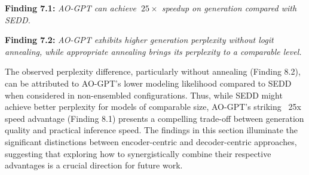 \begin{tcolorbox}[
    enhanced,
    colback=LightGoldenrodYellow!40,
    colframe=black!20,
    arc=2mm, 
    boxrule=0.5pt, 
    boxsep=0mm,
    before skip=2mm,
    after skip=2mm
]
\textbf{Finding 7.1:} \textit{AO-GPT can achieve $~25\times$ speedup on generation compared with SEDD.}

\textbf{Finding 7.2:} \textit{AO-GPT exhibits higher generation perplexity without logit annealing, while appropriate annealing brings its perplexity to a comparable level.}
\end{tcolorbox}

The observed perplexity difference, particularly without annealing (Finding 8.2), can be attributed to AO-GPT's lower modeling likelihood compared to SEDD when considered in non-ensembled configurations. Thus, while SEDD might achieve better perplexity for models of comparable size, AO-GPT's striking ~25x speed advantage (Finding 8.1) presents a compelling trade-off between generation quality and practical inference speed. The findings in this section illuminate the significant distinctions between encoder-centric and decoder-centric approaches, suggesting that exploring how to synergistically combine their respective advantages is a crucial direction for future work.

